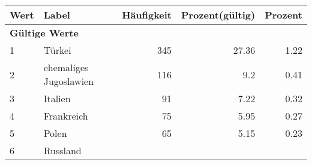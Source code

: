      \begin{longtable}{lXrrr}
     \toprule
     \textbf{Wert} & \textbf{Label} & \textbf{Häufigkeit} & \textbf{Prozent(gültig)} & \textbf{Prozent} \\
     \endhead
     \midrule
     \multicolumn{5}{l}{\textbf{Gültige Werte}}\\

     1 &
     \multicolumn{1}{X}{ Türkei   } &


       \num{345} &
       \num[round-mode=places,round-precision=2]{27.36} &
         \num[round-mode=places,round-precision=2]{1.22} \\

     2 &
     \multicolumn{1}{X}{ ehemaliges Jugoslawien   } &


       \num{116} &
       \num[round-mode=places,round-precision=2]{9.2} &
         \num[round-mode=places,round-precision=2]{0.41} \\

     3 &
     \multicolumn{1}{X}{ Italien   } &


       \num{91} &
       \num[round-mode=places,round-precision=2]{7.22} &
         \num[round-mode=places,round-precision=2]{0.32} \\

     4 &
     \multicolumn{1}{X}{ Frankreich   } &


       \num{75} &
       \num[round-mode=places,round-precision=2]{5.95} &
         \num[round-mode=places,round-precision=2]{0.27} \\

     5 &
     \multicolumn{1}{X}{ Polen   } &


       \num{65} &
       \num[round-mode=places,round-precision=2]{5.15} &
         \num[round-mode=places,round-precision=2]{0.23} \\

     6 &
     \multicolumn{1}{X}{ Russland   } &



\end{longtable}
